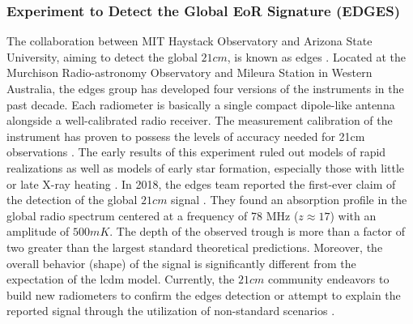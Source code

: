 \documentclass[12pt, TexShade, letterpaper]{report}
\begin{document}
\subsubsection{Experiment to Detect the Global EoR Signature (EDGES)}
The collaboration between MIT Haystack Observatory and Arizona State University, aiming to detect the global $21cm$, is known as \gls{edges} \cite{edges_website_1, edges_website_2}. Located at the Murchison Radio-astronomy Observatory and Mileura Station in Western Australia, the \gls{edges} group has developed four versions of the instruments in the past decade. Each radiometer is basically a single compact dipole-like antenna alongside a well-calibrated radio receiver. The measurement calibration of the instrument has proven to possess the levels of accuracy needed for 21cm observations \cite{edges_calibration_1, edges_calibration_2}. The early results of this experiment ruled out models of rapid realizations as well as models of early star formation, especially those with little or late X-ray heating \cite{edges_lower_limit, edges_high_band_constrain}. In 2018, the \gls{edges} team reported the first-ever claim of the detection of the global $21cm$ signal \cite{edges}. They found an absorption profile in the global radio spectrum centered at a frequency of 78 MHz ($z\approx 17$) with an amplitude of $500mK$. The depth of the observed trough is more than a factor of two greater than the largest standard theoretical predictions. Moreover, the overall behavior (shape) of the signal is significantly different from the expectation of the \gls{lcdm} model. Currently, the $21cm$ community endeavors to build new radiometers to confirm the \gls{edges} detection or attempt to explain the reported signal through the utilization of non-standard scenarios \cite{dark_ages_space, thesis_shedding, edges_toward_emprical}.\par
\end{document}
